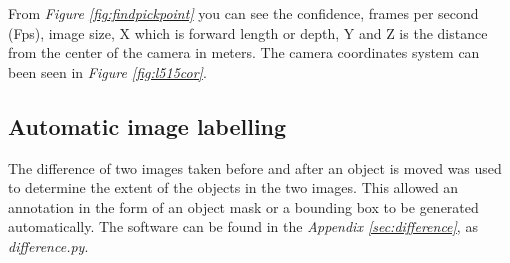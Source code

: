 From \textit{Figure \ref{fig:findpickpoint}} you can see the confidence, frames per second (Fps), image size, X which is forward length or depth, Y and Z is the distance from the center of the camera in meters. 
The camera coordinates system can been seen in \textit{Figure \ref{fig:l515cor}}.


\subsection{Automatic image labelling}\label{labelimg}

The difference of two images taken before and after an object is moved was used to determine the extent of the objects in the two images. This allowed an annotation in the form of an object mask or a bounding box to be generated automatically. The software can be found in the \textit{Appendix \ref{sec:difference}}, as \textit{difference.py}.

